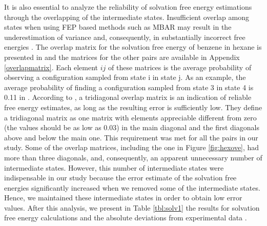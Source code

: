 \FloatBarrier
It is also essential to analyze the reliability of solvation free energy estimations through the overlapping of the intermediate states. Insufficient overlap among states when using FEP based methods such as MBAR may result in the underestimation of variance and, consequently, in substantially incorrect free energies \cite{klimovich}. The overlap matrix for the solvation free energy of benzene in hexane is presented in  and the matrices for the other pairs are available in Appendix \ref{overlapmatrix}. Each element $ij$ of these matrices is the average probability of observing a configuration sampled from state i in state j. As an example, the average probability of finding a configuration sampled from state 3 in state 4 is 0.11 in . According to , a tridiagonal overlap matrix is an indication of reliable free energy estimates, as long as the resulting error is sufficiently low. They define a tridiagonal matrix as one matrix with elements appreciable different from zero (the values should be as low as 0.03) in the main diagonal and the first diagonals above and below the main one. This requirement was met for all the pairs in our study. Some of the overlap matrices, including the one in Figure \ref{fig:hexove}, had more than three diagonals, and, consequently, an apparent unnecessary number of intermediate states. However, this number of intermediate states were indispensable in our study because the error estimate of the solvation free energies significantly increased when we removed some of the intermediate states. Hence, we maintained these intermediate states in order to obtain low error values. After this analysis, we present in Table \ref{tbl:solv1} the results for solvation free energy calculations and the absolute deviations from experimental data \cite{doi:10.1021/ci034120c}.  

